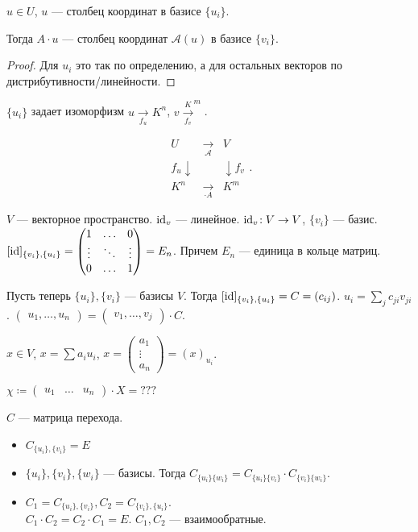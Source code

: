 \begin{statement}
    $u \in U$,  $u$ --- столбец координат в базисе  $\{u_i\}$.

    Тогда  $A \cdot u$ --- столбец координат  $\mathcal{A}(u)$ в базисе  $\{v_i\}$.
\end{statement}
\begin{proof}
    Для $u_i$ это так по определению, а для остальных векторов по дистрибутивности/линейности. 
\end{proof}
\begin{remark}
    $\{u_i\}$ задает изоморфизм  $u \xrightarrow[f_u]{} K^n$,  $v \xrightarrow[f_v] K^m$.

    \[
    \begin{matrix}
        U & \xrightarrow[\mathcal{A}]{} & V \\
        f_u \downarrow & & \downarrow f_v \\
        K^n & \xrightarrow[\cdot A]{} & K^m
    \end{matrix}
    .\] 
\end{remark}

$V$ --- векторное пространство.  $\operatorname{id}_v$ --- линейное.  $\operatorname{id}_v\!: V \to V$,  $\{v_i\}$ --- базис.  $[\operatorname{id}]_{\{v_i\}, \{u_i\}} = \begin{pmatrix} 1 & \ldots & 0 \\ \vdots & \ddots & \vdots \\ 0 & \ldots & 1 \end{pmatrix} = E_n$. Причем  $E_n$ --- единица в кольце матриц.


Пусть теперь $\{u_i\}, \{v_i\}$ --- базисы  $V$. Тогда  $[\operatorname{id}]_{\{v_i\}, \{u_i\}} = C = (c_{ij})$. $u_i = \sum_j c_{ji} v_{ji}$.  $\begin{pmatrix} u_1, \ldots, u_n\end{pmatrix} = \begin{pmatrix}v_1, \ldots, v_j \end{pmatrix} \cdot C$.

$x\in V$,  $x = \sum a_i u_i$,  $x = \begin{pmatrix} a_1 \\ \vdots \\ a_n \end{pmatrix} = (x)_{u_i}$.

$\chi \coloneqq \begin{pmatrix} u_1 & \ldots & u_n \end{pmatrix} \cdot X= ???$

$C$ --- матрица перехода.
 \begin{remark}
\begin{itemize}
    \item $C_{\{u_i\}, \{v_i\}} = E$
    \item $\{u_i\}, \{v_i\}, \{w_i\}$ --- базисы. Тогда $C_{\{u_i\}\{w_i\}} = C_{\{u_i\}\{v_i\}} \cdot C_{\{v_i\}\{w_i\}}$.
    \item  $C_1 = C_{\{u_i\}, \{v_i\}}, C_2 = C_{\{v_i\}, \{u_i\}}$. \\
        $C_1 \cdot C_2 = C_2 \cdot C_1 = E$. $C_1, C_2$ --- взаимообратные.
\end{itemize}
\end{remark}
